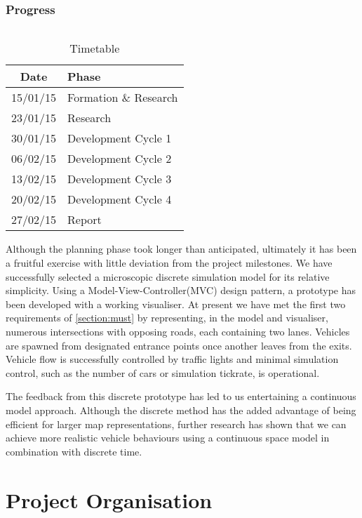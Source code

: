 \documentclass[11pt,a4paper]{article}
\begin{document}
\section{Progress}
\paragraph{}
\begin{wraptable}{r}{6cm}
	\begin{tabular}{|c|l|}
	\hline
	\textbf{Date} & \textbf{Phase} \\ \hline
	15/01/15 & Formation \& Research \\ \hline
	23/01/15 & Research \\ \hline
	30/01/15 & Development Cycle 1 \\ \hline
	06/02/15 & Development Cycle 2 \\ \hline
	13/02/15 & Development Cycle 3 \\ \hline
	20/02/15 & Development Cycle 4 \\ \hline
	27/02/15 & Report \\ \hline
	\end{tabular}
	\caption{Timetable}
\end{wraptable}
Although the planning phase took longer than anticipated, ultimately it has been a fruitful exercise with little deviation from the project milestones.  We have successfully selected a microscopic discrete simulation model for its relative simplicity.  Using a Model-View-Controller(MVC) design pattern, a prototype has been developed with a working visualiser.  At present we have met the first two requirements of \ref{section:must} by representing, in the model and visualiser, numerous intersections with opposing roads, each containing two lanes.  Vehicles are spawned from designated entrance points once another leaves from the exits.  Vehicle flow is successfully controlled by traffic lights and minimal simulation control, such as the number of cars or simulation tickrate, is operational.

The feedback from this discrete prototype has led to us entertaining a continuous model approach.  Although the discrete method has the added advantage of being efficient for larger map representations, further research has shown that we can achieve more realistic vehicle behaviours using a continuous space model in combination with discrete time.


\part*{Project Organisation}
\end{document}
